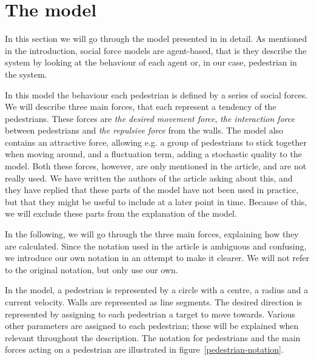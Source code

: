 \section{The model}
\label{sec:the-model}
In this section we will go through the model presented in \cite{self-org} in 
detail. As mentioned in the introduction, social force models are agent-based, 
that is they describe the system by looking at the behaviour of each agent or, 
in our case, pedestrian in the system.


In this model the behaviour each pedestrian is defined by a series of social 
forces. We will describe three main forces, that each represent a tendency of 
the pedestrians. These forces are \emph{the desired movement force},  
\emph{the interaction force} between pedestrians and \emph{the repulsive 
force}  from the walls. The model also contains an attractive force, allowing 
e.g. a group of pedestrians to stick together when moving around, and a 
fluctuation term, adding a stochastic quality to the model. Both these forces, 
however, are only mentioned in the article, and are not really used. We have 
written the authors of the article asking about this, and they have replied 
that these parts of the model have not been used in practice, but that they 
might be useful to include at a later point in time.  Because of this, we will 
exclude these parts from the explanation of the model.

In the following, we will go through the three main forces, explaining how 
they are calculated. Since the notation used in the article is ambiguous and 
confusing, we introduce our own notation in an attempt to make it clearer. We 
will not refer to the original notation, but only use our own.

In the model, a pedestrian is represented by a circle with a centre, a radius 
and a current velocity. Walls are represented as line segments. The desired 
direction is represented by assigning to each pedestrian a target to move 
towards. Various other parameters are assigned to each pedestrian; these will 
be explained when relevant throughout the description. The notation for 
pedestrians and the main forces acting on a pedestrian are illustrated in  
figure~\ref{pedestrian-notation}.  

